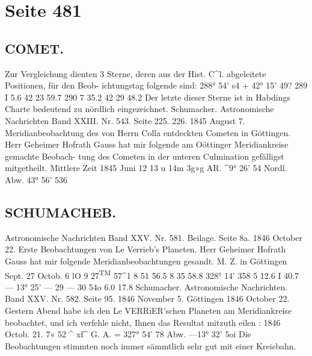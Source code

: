 \documentclass[10pt,a4paper]{article}
\begin{document}
\newpage
\section*{Seite 481}

\subsection*{COMET.}

Zur  Vergleichung  dienten  3  Sterne,  deren  aus  der  Hist.  C\textasciicircum{}l.  abgeleitete  Positionen,  für  den  Beob-
ichtungstag  folgende  sind:
288°  54'     s\glqq{}4         +  42°  15'    49\glqq{}?
289  I       5.6  42     23     59.7
290  7     35.2  42     29     48.2
Der  letzte  dieser  Sterne  ist  in  Habdings  Charte  bedeutend  zu  nördlich  eingezeichnet.
Schumacher.
Astronomische  Nachrichten  Band  XXIII.  Nr.  543.  Seite  225.  226.     1845  August  7.
Meridianbeobachtung  des  von  Herrn  Colla  entdeckten  Cometen  in  Göttingen.
Herr  Geheimer  Hofrath  Gauss  hat  mir  folgende  am  Oöttinger  Meridiankreise  gemachte  Beobach-
tung des  Cometen  in  der  unteren  Culmination  gefälligst  mitgetheilt.
Mittlere  Zeit
1845  Juni  12
13 u   14m  3g»g
AR.
\textasciicircum{}9°  26'  5\glqq{}4
Nordl.  Abw.
43°  56'  53\glqq{}6
\subsection*{SCHUMACHEB.}

Astronomische  Nachrichten  Band  XXV.  Nr.  581.  Beilage.  Seite  8a.    1846  October  22.
Erste  Beobachtungen  von  Le  Verrieb's  Planeten.
Herr  Geheimer  Hofrath  Gauss  hat  mir  folgende  Meridianbeobachtungen  gesandt.
M.  Z.  in  Göttingen
Sept.    27
Octob.    6
lO
9\glqq{}  27\textsuperscript{TM}  57\textasciicircum{}1
8     51     56.5
8     35     58.8
328°  14'    35\glqq{}8
5     12.6
I     40.7
---  13°   25'
---  29
---  30
54\glqq{}o
6.0
17.8
Schumacher.
Astronomische  Nachrichten.    Band  XXV.  Nr.  582.  Seite  95.    1846  November  5.
Göttingen  1846  October  22.
Gestern  Abend  habe  ich  den  Le  VERRiER'schen  Planeten  am  Meridiankreise  beobachtet,  und  ich
verfehle  nicht,  Ihnen  das  Resultat  mitzuth eilen :
1846  Octob.  21.        7«  52  \glqq{}\textasciicircum{}  xf\textasciicircum{}        G.  A.  =  327°  54'  7\glqq{}8        Abw.  ---13°  32'  5o\glqq{}i
Die  Beobachtungen  stimmten  noch  immer  sämmtlich  sehr  gut  mit  einer  Kreisbahn.

\newpage
\end{document}
